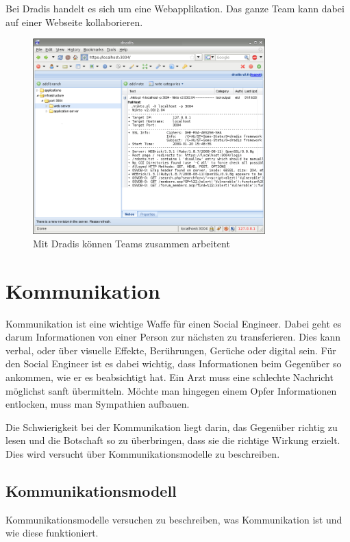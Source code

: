 Bei Dradis handelt es sich um eine Webapplikation. Das ganze Team kann dabei auf einer Webseite kollaborieren.

\begin{figure}[htb]
  \centering
  \includegraphics[width=0.8\textwidth]{images/dradis.png}
  \caption[Mit Dradis können Teams zusammen arbeitent]{Mit Dradis können Teams zusammen arbeitent}
  \label{fig:socialengineering:informationssammlung:datenorganisation:dradis}
\end{figure}

\section{Kommunikation}
\label{sec:socialengineering:kommunikation}
Kommunikation ist eine wichtige Waffe für einen Social Engineer. Dabei geht es darum Informationen von einer Person zur nächsten zu transferieren. Dies kann verbal, oder über visuelle Effekte, Berührungen, Gerüche oder digital sein.
Für den Social Engineer ist es dabei wichtig, dass Informationen beim Gegenüber so ankommen, wie er es beabsichtigt hat.
Ein Arzt muss eine schlechte Nachricht möglichst sanft übermitteln. Möchte man hingegen einem Opfer Informationen entlocken, muss man Sympathien aufbauen.

Die Schwierigkeit bei der Kommunikation liegt darin, das Gegenüber richtig zu lesen und die Botschaft so zu überbringen, dass sie die richtige Wirkung erzielt.
Dies wird versucht über Kommunikationsmodelle zu beschreiben.

\subsection{Kommunikationsmodell}
\label{sec:socialengineering:kommunikation:kommunikationsmodell}
Kommunikationsmodelle versuchen zu beschreiben, was Kommunikation ist und wie diese funktioniert. 

